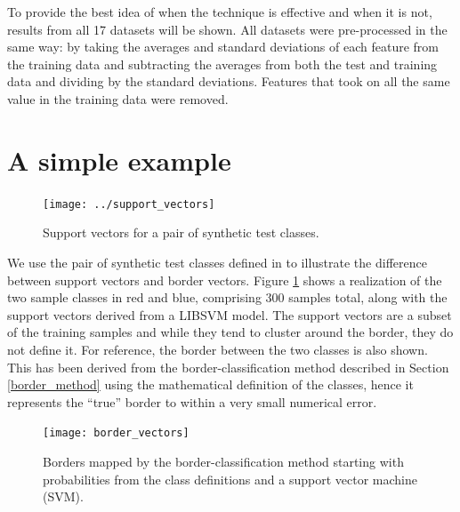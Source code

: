 To provide the best idea of when the technique is effective and when it is
not, results from all 17 datasets will be shown. 
All datasets were pre-processed in the same way: by taking the averages and
standard deviations of each feature from the training data and subtracting
the averages from both the test and training data and dividing by the 
standard deviations.
Features that took on all the same value in the training data were removed.


\section{A simple example}

\label{example}

\begin{figure}
\texttt{[image: ../support\_vectors]}
\caption{Support vectors for a pair of synthetic test classes.}\label{sample_sv}
\end{figure}

We use the pair of synthetic test classes defined in \citet{Mills2011} to 
illustrate the difference between support vectors and border vectors.
Figure \ref{sample_sv} shows a realization of the two sample classes 
in red and blue, comprising 300 samples total, along
with the support vectors derived from a LIBSVM model.
The support vectors are a subset of the training samples and while they
tend to cluster around the border, they do not define it.
For reference, the border between the two classes is also shown.
This has been derived from the border-classification method described in 
Section \ref{border_method} using the mathematical definition of the classes,
hence it represents the ``true'' border to within a very small numerical error.

\begin{figure}
\texttt{[image: border\_vectors]}
\caption{Borders mapped by the border-classification method starting with probabilities from the class definitions and a support vector machine (SVM).}
\label{border_vectors}
\end{figure}

